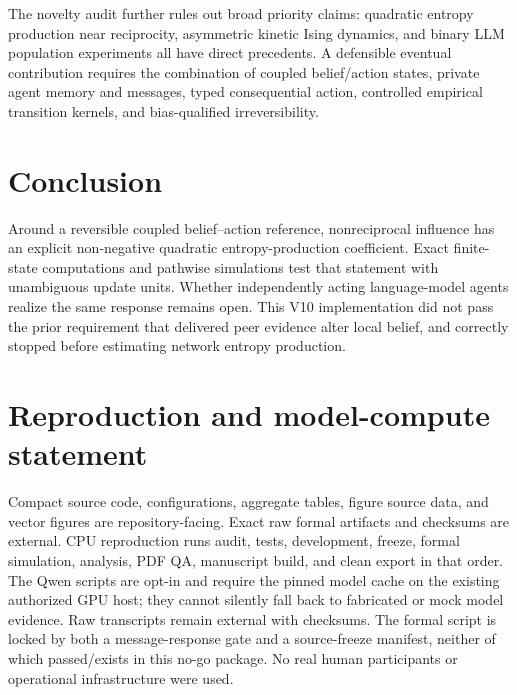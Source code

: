 \documentclass[12pt]{article}
\begin{document}
The novelty audit further rules out broad priority claims: quadratic entropy
production near reciprocity, asymmetric kinetic Ising dynamics, and binary LLM
population experiments all have direct precedents. A defensible eventual
contribution requires the combination of coupled belief/action states, private
agent memory and messages, typed consequential action, controlled empirical
transition kernels, and bias-qualified irreversibility.

\section{Conclusion}

Around a reversible coupled belief--action reference, nonreciprocal influence
has an explicit non-negative quadratic entropy-production coefficient. Exact
finite-state computations and pathwise simulations test that statement with
unambiguous update units. Whether independently acting language-model agents
realize the same response remains open. This V10 implementation did not pass
the prior requirement that delivered peer evidence alter local belief, and
correctly stopped before estimating network entropy production.

\section*{Reproduction and model-compute statement}

Compact source code, configurations, aggregate tables, figure source data, and
vector figures are repository-facing. Exact raw formal artifacts and checksums
are external. CPU reproduction runs audit, tests, development, freeze, formal
simulation, analysis, PDF QA, manuscript build, and clean export in that order.
The Qwen scripts are opt-in and require the pinned model cache on the existing
authorized GPU host; they cannot silently fall back to fabricated or mock model
evidence. Raw transcripts remain external with checksums. The formal script is
locked by both a message-response gate and a source-freeze manifest, neither of
which passed/exists in this no-go package. No real human participants or
operational infrastructure were used.



\end{document}
